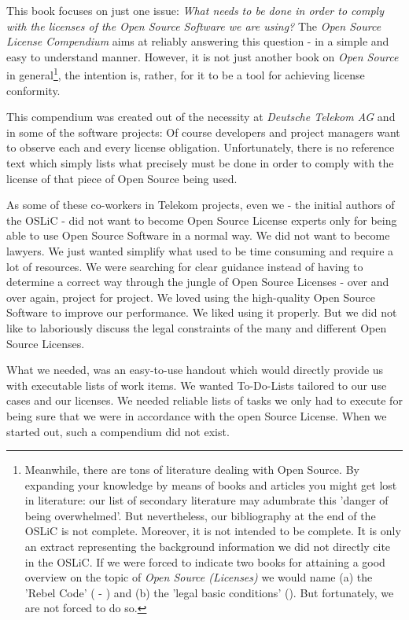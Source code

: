 This book focuses on just one issue: \emph{What needs to be done in order to
comply with the licenses of the \emph{Open Source Software} we are using?} The
\emph{Open Source License Compendium} aims at reliably answering this question -
in a simple and easy to understand manner. However, it is not just another book
on \emph{Open Source} in ge\-ne\-ral\footnote{Meanwhile, there are tons of
literature dealing with Open Source. By expanding your knowledge by means of
books and articles you might get lost in literature: our list of secondary
literature may adumbrate this 'danger of being overwhelmed'. But nevertheless,
our bibliography at the end of the OSLiC is not complete. Moreover, it is not
intended to be complete. It is only an extract representing the background
information we did not directly cite in the OSLiC. If we were forced to indicate
two books for attaining a good overview on the topic of \emph{Open Source
(Licenses)} we would name (a) the 'Rebel Code' (\cite[for a German version
cf.][\nopage passim]{Moody2001a} - \cite[for an English version
cf.][passim]{Moody2002a}) and (b) the 'legal basic conditions'
(\cite[cf.][\nopage passim]{JaeMet2011a}). But fortunately, we are not forced to
do so.}, the intention is, rather, for it to be a tool for achieving license
conformity.

This compendium was created out of the necessity at \emph{Deutsche Telekom AG}
and in some of the software projects: Of course developers and project managers
want to observe each and every license obligation. Unfortunately, there is no
reference text which simply lists what precisely must be done in order to comply
with the license of that piece of Open Source being used.

As some of these co-workers in Telekom projects, even we - the initial authors
of the OSLiC - did not want to become Open Source License experts only for being
able to use Open Source Software in a normal way. We did not want to become
lawyers. We just wanted simplify what used to be time consuming and require a
lot of resources. We were searching for clear guidance instead of having to
determine a correct way through the jungle of Open Source Licenses - over and
over again, project for project. We loved using the high-quality Open Source
Software to improve our performance. We liked using it properly. But we did not
like to laboriously discuss the legal constraints of the many and different Open
Source Licenses.

What we needed, was an easy-to-use handout which would directly provide us with
executable lists of work items. We wanted To-Do-Lists tailored to our use cases
and our licenses. We needed reliable lists of tasks we only had to execute for
being sure that we were in accordance with the open Source License. When we
started out, such a compendium did not exist.

